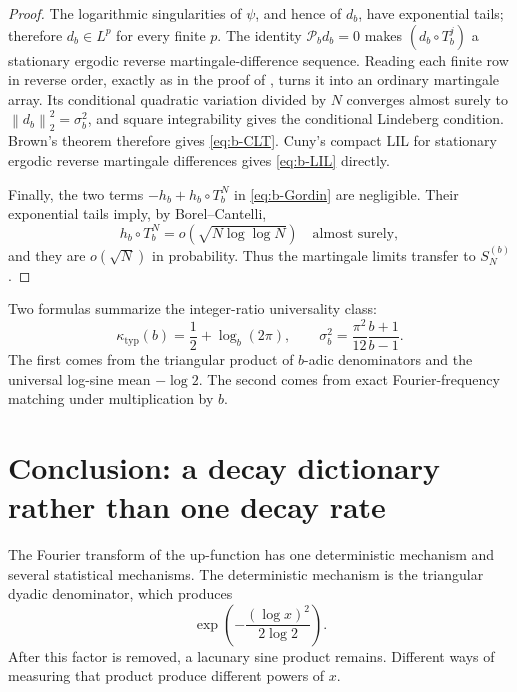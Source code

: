 \documentclass[11pt,oneside]{article}
\numberwithin{equation}{section}
\theoremstyle{definition}
\theoremstyle{remark}
\newcommand{\norm}[1]{\left\lVert#1\right\rVert}
\newcommand{\Perron}{\mathcal P}
\begin{document}
\begin{proof}
The logarithmic singularities of \(\psi\), and hence of \(d_b\), have exponential tails;
therefore \(d_b\in L^p\) for every finite \(p\).  The identity
\(\Perron_bd_b=0\) makes \((d_b\circ T_b^j)\) a stationary ergodic reverse
martingale-difference sequence.  Reading each finite row in reverse order, exactly as in the
proof of , turns it into an ordinary martingale array.  Its conditional
quadratic variation divided by \(N\) converges almost surely to
\(\norm{d_b}_2^2=\sigma_b^2\), and square integrability gives the conditional Lindeberg
condition.  Brown's theorem \cite{brown} therefore gives \eqref{eq:b-CLT}.  Cuny's compact
LIL for stationary ergodic reverse martingale differences \cite{cuny-lil} gives
\eqref{eq:b-LIL} directly.

Finally, the two terms \(-h_b+h_b\circ T_b^N\) in \eqref{eq:b-Gordin} are negligible.
Their exponential tails imply, by Borel--Cantelli,
\[
 h_b\circ T_b^N=o(\sqrt{N\log\log N})
 \quad\text{almost surely},
\]
and they are \(o(\sqrt N)\) in probability.  Thus the martingale limits transfer to
\(S_N^{(b)}\).
\end{proof}

\begin{meaningbox}
Two formulas summarize the integer-ratio universality class:
\[
 \kappa_{\mathrm{typ}}(b)=\frac12+\log_b(2\pi),
 \qquad
 \sigma_b^2=\frac{\pi^2}{12}\frac{b+1}{b-1}.
\]
The first comes from the triangular product of \(b\)-adic denominators and the universal
log-sine mean \(-\log2\).  The second comes from exact Fourier-frequency matching under
multiplication by \(b\).
\end{meaningbox}

\section{Conclusion: a decay dictionary rather than one decay rate}
\label{sec:conclusion}

The Fourier transform of the up-function has one deterministic mechanism and several
statistical mechanisms.  The deterministic mechanism is the triangular dyadic denominator,
which produces
\[
 \exp\!\left(-\frac{(\log x)^2}{2\log2}\right).
\]
After this factor is removed, a lacunary sine product remains.  Different ways of measuring
that product produce different powers of \(x\).
\end{document}
